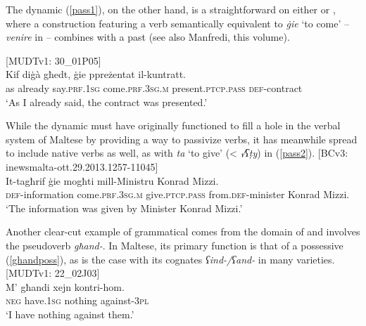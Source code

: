 \documentclass[output=paper]{langsci/langscibook}
\begin{document}
The dynamic  (\ref{pass1}), on the other hand, is a straightforward  on either  or , where a construction featuring a verb semantically equi\-valent to \textit{ġie} `to come' -- \textit{venire} in  -- combines with a past  (see also Manfredi, this volume).

\ea\label{pass1}
{[MUDTv1: 30\_01P05]} \\
\gll Kif diġà għedt, ġie ppreżentat il-kuntratt.\\
	as already say.\textsc{prf.1sg} come.\textsc{prf.3sg.m} present.\textsc{ptcp.pass} \textsc{def}-contract\\
	\glt `As I already said, the contract was presented.'\\
\z

While the dynamic  must have originally functioned to fill a hole in the verbal system of Maltese by providing a way to passivize  verbs, it has meanwhile spread to include native verbs as well, as with \textit{ta} `to give' (< \textit{√ʕṭy}) in (\ref{pass2}).
\ea\label{pass2}
{[BCv3: inewsmalta-ott.29.2013.1257-11045]} \\
\gll It-tagħrif ġie mogħti mill-Ministru Konrad Mizzi.\\
	\textsc{def}-information come.\textsc{prf.3sg.m} give.\textsc{ptcp.pass} from.\textsc{def}-minister Konrad Mizzi.\\
	\glt `The information was given by Minister Konrad Mizzi.'\\
\z

Another clear-cut example of grammatical  comes from the domain of  and involves the pseudoverb \textit{għand-}. In Maltese, its primary function is that of a possessive (\ref{ghandposs}), as is the case with its cognates \textit{ʕind-/ʕand-} in many  varieties.
\ea\label{ghandposs}
{[MUDTv1: 22\_02J03]} \\
    \gll M' għandi xejn kontri-hom.\\
	\textsc{neg} have.\textsc{1sg} nothing against-\textsc{3pl}\\
	\glt `I have nothing against them.'\\
\z
\end{document}
